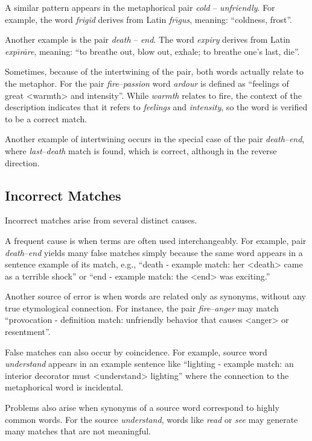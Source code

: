 \documentclass[12pt,a4paper]{article}
\begin{document}
A similar pattern appears in the metaphorical pair \textit{cold} -- \textit{unfriendly}. For example, the word \textit{frigid} derives from Latin \textit{fr\={\i}gus}, meaning: “coldness, frost”.

Another example is the pair \textit{death} -- \textit{end}. The word \textit{expiry} derives from Latin \textit{exp\={\i}r\=are}, meaning: “to breathe out, blow out, exhale; to breathe one’s last, die”.

Sometimes, because of the intertwining of the pair, both words actually relate to the metaphor. For the pair \textit{fire}--\textit{passion} word \textit{ardour} is defined as “feelings of great \textless warmth\textgreater{} and intensity”. While \textit{warmth} relates to fire, the context of the description indicates that it refers to \textit{feelings} and \textit{intensity}, so the word is verified to be a correct match.

Another example of intertwining occurs in the special case of the pair \textit{death}--\textit{end}, where \textit{last}--\textit{death} match is found, which is correct, although in the reverse direction.

\subsection*{Incorrect Matches}

Incorrect matches arise from several distinct causes.  

A frequent cause is when terms are often used interchangeably. For example, pair \textit{death}--\textit{end}  yields many false matches simply because the same word appears in a sentence example of its match, e.g., “death - example match: her \textless death\textgreater{} came as a terrible shock” or “end - example match: the \textless end\textgreater{}  was exciting.” 

Another source of error is when words are related only as synonyms, without any true etymological connection. For instance, the pair \textit{fire}--\textit{anger} may match “provocation - definition match: unfriendly behavior that causes \textless anger\textgreater{} or resentment”.

False matches can also occur by coincidence. For example, source word \textit{understand} appears in an example sentence like “lighting - example match: an interior decorator must \textless understand\textgreater{} lighting” where the connection to the metaphorical word is incidental.  

Problems also arise when synonyms of a source word correspond to highly common words. For the source \textit{understand}, words like \textit{read} or \textit{see} may generate many matches that are not meaningful.  
\end{document}
